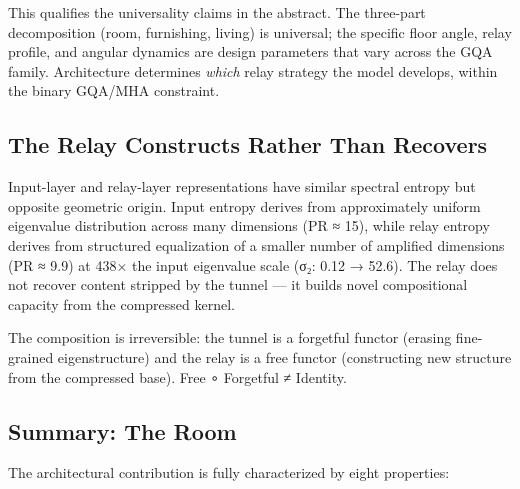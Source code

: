 \documentclass[12pt]{article}
\begin{document}
This qualifies the universality claims in the abstract. The three-part decomposition (room, furnishing, living) is universal; the specific floor angle, relay profile, and angular dynamics are design parameters that vary across the GQA family. Architecture determines \textit{which} relay strategy the model develops, within the binary GQA/MHA constraint.

\subsection{The Relay Constructs Rather Than Recovers}

Input-layer and relay-layer representations have similar spectral entropy but opposite geometric origin. Input entropy derives from approximately uniform eigenvalue distribution across many dimensions (PR ≈ 15), while relay entropy derives from structured equalization of a smaller number of amplified dimensions (PR ≈ 9.9) at 438× the input eigenvalue scale (σ₂: 0.12 → 52.6). The relay does not recover content stripped by the tunnel — it builds novel compositional capacity from the compressed kernel.

The composition is irreversible: the tunnel is a forgetful functor (erasing fine-grained eigenstructure) and the relay is a free functor (constructing new structure from the compressed base). Free ∘ Forgetful ≠ Identity.

\subsection{Summary: The Room}

The architectural contribution is fully characterized by eight properties:
\end{document}
